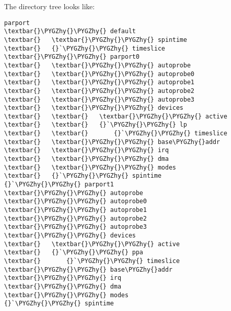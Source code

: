 \documentclass[a4paper,8pt,english]{sphinxmanual}
\def\PYGZhy{\char`\-}
\begin{document}
The  directory tree looks like:

\begin{Verbatim}[commandchars=\\\{\}]
parport
\textbar{}\PYGZhy{}\PYGZhy{} default
\textbar{}   \textbar{}\PYGZhy{}\PYGZhy{} spintime
\textbar{}   {}`\PYGZhy{}\PYGZhy{} timeslice
\textbar{}\PYGZhy{}\PYGZhy{} parport0
\textbar{}   \textbar{}\PYGZhy{}\PYGZhy{} autoprobe
\textbar{}   \textbar{}\PYGZhy{}\PYGZhy{} autoprobe0
\textbar{}   \textbar{}\PYGZhy{}\PYGZhy{} autoprobe1
\textbar{}   \textbar{}\PYGZhy{}\PYGZhy{} autoprobe2
\textbar{}   \textbar{}\PYGZhy{}\PYGZhy{} autoprobe3
\textbar{}   \textbar{}\PYGZhy{}\PYGZhy{} devices
\textbar{}   \textbar{}   \textbar{}\PYGZhy{}\PYGZhy{} active
\textbar{}   \textbar{}   {}`\PYGZhy{}\PYGZhy{} lp
\textbar{}   \textbar{}       {}`\PYGZhy{}\PYGZhy{} timeslice
\textbar{}   \textbar{}\PYGZhy{}\PYGZhy{} base\PYGZhy{}addr
\textbar{}   \textbar{}\PYGZhy{}\PYGZhy{} irq
\textbar{}   \textbar{}\PYGZhy{}\PYGZhy{} dma
\textbar{}   \textbar{}\PYGZhy{}\PYGZhy{} modes
\textbar{}   {}`\PYGZhy{}\PYGZhy{} spintime
{}`\PYGZhy{}\PYGZhy{} parport1
\textbar{}\PYGZhy{}\PYGZhy{} autoprobe
\textbar{}\PYGZhy{}\PYGZhy{} autoprobe0
\textbar{}\PYGZhy{}\PYGZhy{} autoprobe1
\textbar{}\PYGZhy{}\PYGZhy{} autoprobe2
\textbar{}\PYGZhy{}\PYGZhy{} autoprobe3
\textbar{}\PYGZhy{}\PYGZhy{} devices
\textbar{}   \textbar{}\PYGZhy{}\PYGZhy{} active
\textbar{}   {}`\PYGZhy{}\PYGZhy{} ppa
\textbar{}       {}`\PYGZhy{}\PYGZhy{} timeslice
\textbar{}\PYGZhy{}\PYGZhy{} base\PYGZhy{}addr
\textbar{}\PYGZhy{}\PYGZhy{} irq
\textbar{}\PYGZhy{}\PYGZhy{} dma
\textbar{}\PYGZhy{}\PYGZhy{} modes
{}`\PYGZhy{}\PYGZhy{} spintime
\end{Verbatim}
\end{document}
